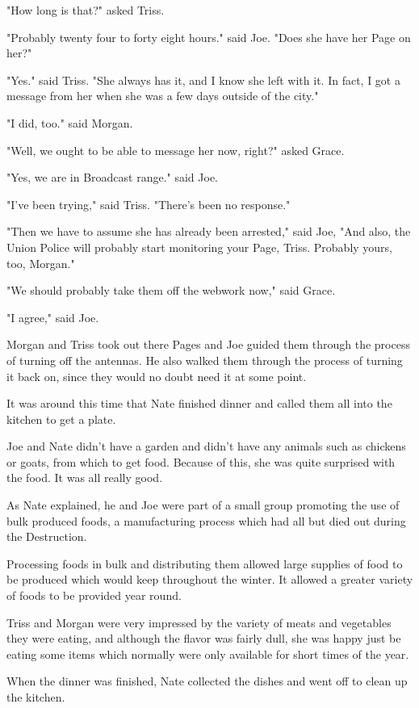\documentclass[courier]{sffms}
\begin{document}
"How long is that?" asked Triss.

"Probably twenty four to forty eight hours." said Joe.
"Does she have her Page on her?"

"Yes." said Triss. "She always has it, and I know she
left with it. In fact, I got a message from her when
she was a few days outside of the city."

"I did, too." said Morgan.

"Well, we ought to be able to message her now, right?"
asked Grace.

"Yes, we are in Broadcast range." said Joe.

"I've been trying," said Triss. "There's been no response."

"Then we have to assume she has already been arrested,"
said Joe, "And also, the Union Police will probably start
monitoring your Page, Triss. Probably yours, too, Morgan."

"We should probably take them off the webwork now,"
said Grace.

"I agree," said Joe.

Morgan and Triss took out there Pages and Joe guided
them through the process of turning off the antennas.
He also walked them through the process of turning it
back on, since they would no doubt need it at some
point.

It was around this time that Nate finished dinner and
called them all into the kitchen to get a plate.

Joe and Nate didn't have a garden and didn't have any
animals such as chickens or goats, from which to
get food. Because of this, she was quite surprised with
the food. It was all really good.

As Nate explained, he and Joe were part of a small
group promoting the use of bulk produced foods, a
manufacturing process which had all but died out
during the Destruction.

Processing foods in bulk and distributing them allowed
large supplies of food to be produced which would
keep throughout the winter. It allowed a greater
variety of foods to be provided year round.

Triss and Morgan were very impressed by the variety of
meats and vegetables they were eating, and although
the flavor was fairly dull, she was happy just be eating
some items which normally were only available for
short times of the year.

When the dinner was finished, Nate collected the
dishes and went off to clean up the kitchen.
\end{document}
